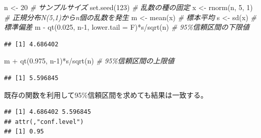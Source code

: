 \documentclass[
  ja=standard, xelatex, base=12pt]{bxjsreport}
\newenvironment{Shaded}{\begin{snugshade}}{\end{snugshade}}
\newcommand{\AttributeTok}[1]{\textcolor[rgb]{0.77,0.63,0.00}{#1}}
\newcommand{\CommentTok}[1]{\textcolor[rgb]{0.56,0.35,0.01}{\textit{#1}}}
\newcommand{\DecValTok}[1]{\textcolor[rgb]{0.00,0.00,0.81}{#1}}
\newcommand{\FloatTok}[1]{\textcolor[rgb]{0.00,0.00,0.81}{#1}}
\newcommand{\FunctionTok}[1]{\textcolor[rgb]{0.00,0.00,0.00}{#1}}
\newcommand{\NormalTok}[1]{#1}
\newcommand{\OtherTok}[1]{\textcolor[rgb]{0.56,0.35,0.01}{#1}}
\newcommand{\SpecialCharTok}[1]{\textcolor[rgb]{0.00,0.00,0.00}{#1}}
\begin{document}
\begin{Shaded}
\begin{Highlighting}[]
\NormalTok{n }\OtherTok{\textless{}{-}} \DecValTok{20}             \CommentTok{\# サンプルサイズ}
\FunctionTok{set.seed}\NormalTok{(}\DecValTok{123}\NormalTok{)       }\CommentTok{\# 乱数の種の固定}
\NormalTok{x }\OtherTok{\textless{}{-}} \FunctionTok{rnorm}\NormalTok{(n, }\DecValTok{5}\NormalTok{, }\DecValTok{1}\NormalTok{) }\CommentTok{\# 正規分布N(5,1)からn個の乱数を発生}
\NormalTok{m }\OtherTok{\textless{}{-}} \FunctionTok{mean}\NormalTok{(x)        }\CommentTok{\# 標本平均}
\NormalTok{s }\OtherTok{\textless{}{-}} \FunctionTok{sd}\NormalTok{(x)          }\CommentTok{\# 標準偏差}
\NormalTok{m }\SpecialCharTok{{-}} \FunctionTok{qt}\NormalTok{(}\FloatTok{0.025}\NormalTok{, n}\DecValTok{{-}1}\NormalTok{, }\AttributeTok{lower.tail =}\NormalTok{ F)}\SpecialCharTok{*}\NormalTok{s}\SpecialCharTok{/}\FunctionTok{sqrt}\NormalTok{(n) }\CommentTok{\# 95\%信頼区間の下限値}
\end{Highlighting}
\end{Shaded}

\begin{verbatim}
## [1] 4.686402
\end{verbatim}

\begin{Shaded}
\begin{Highlighting}[]
\NormalTok{m }\SpecialCharTok{+} \FunctionTok{qt}\NormalTok{(}\FloatTok{0.975}\NormalTok{, n}\DecValTok{{-}1}\NormalTok{)}\SpecialCharTok{*}\NormalTok{s}\SpecialCharTok{/}\FunctionTok{sqrt}\NormalTok{(n)                }\CommentTok{\# 95\%信頼区間の上限値}
\end{Highlighting}
\end{Shaded}

\begin{verbatim}
## [1] 5.596845
\end{verbatim}

既存の関数を利用して95\%信頼区間を求めても結果は一致する。

\begin{Shaded}
\end{Shaded}

\begin{verbatim}
## [1] 4.686402 5.596845
## attr(,"conf.level")
## [1] 0.95
\end{verbatim}
\end{document}
